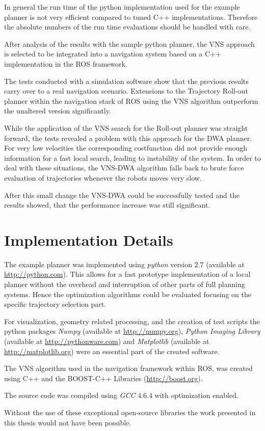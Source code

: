 In general the run time of the python implementation used for the example planner is not very efficient compared to tuned C++ implementations. 
Therefore the absolute numbers of the run time evaluations should be handled with care.

After analysis of the results with the sample python planner, the VNS approach is selected to be integrated into a navigation system based on a C++ implementation in the ROS framework.

The tests conducted with a simulation software show that the previous results carry over to a real navigation scenario. Extensions to the Trajectory Roll-out planner within the navigation stack of ROS using the VNS algorithm outperform the unaltered version significantly.

While the application of the VNS search for the Roll-out planner was straight forward, the tests revealed a problem with this approach for the DWA planner.
For very low velocities the corresponding costfunction did not provide enough information for a fast local search, leading to instability of the system.
In order to deal with these situations, the VNS-DWA algorithm falls back to brute force evaluation of trajectories whenever the robots moves very slow. 

After this small change the VNS-DWA could be successfully tested and the results showed, that the performance increase was still significant.

\section{Implementation Details}
The example planner was implemented using \emph{python} version $2.7$ (available at \url{http://python.com}). This allows for a fast prototype implementation of a local planner without the overhead and interruption of other parts of full planning systems.
Hence the optimization algorithms could be evaluated focusing on the  specific trajectory selection part. 

For visualization, geometry related processing, and the creation of test scripts the python packages \emph{Numpy} (available at \url{http://numpy.org}), \emph{Python Imaging Library} (available at \url{http://pythonware.com}) and \emph{Matplotlib} (available at \url{http://matplotlib.org}) were an essential part of the created software. 

The VNS algorithm used in the navigation framework within ROS, was created using C++ and the BOOST-C++ Libraries (\url{http://boost.org}).

The source code was compiled using \emph{GCC} $4.6.4$ with optimization enabled.

Without the use of these exceptional open-source libraries the work presented in this thesis would not have been possible.  

 

